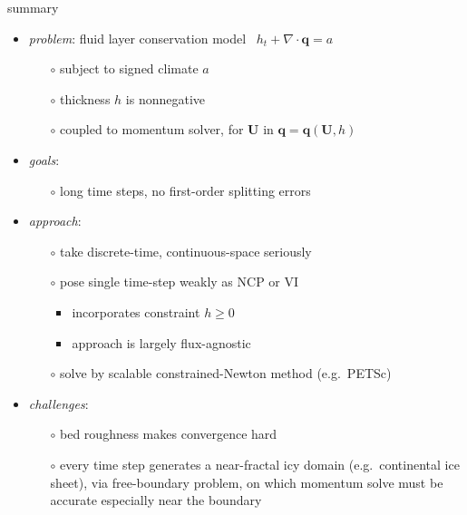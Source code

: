 \documentclass[xcolor={dvipsnames}]{beamer}
\newcommand\bq{\mathbf{q}}
\newcommand\bU{\mathbf{U}}
\newcommand\Div{\nabla\cdot}
\begin{document}
\begin{frame}{summary}

  \begin{itemize}
  \item \emph{problem}: fluid layer conservation model \, $h_t + \Div\bq = a$
    \begin{itemize}
    \item[$\circ$]  subject to signed climate $a$
    \item[$\circ$]  thickness $h$ is nonnegative
    \item[$\circ$]  coupled to momentum solver, for $\bU$ in $\bq=\bq(\bU,h)$
    \end{itemize}
  \item \emph{goals}:
    \begin{itemize}
    \item[$\circ$]  long time steps, no first-order splitting errors
    \end{itemize}
  \item \emph{approach}:
    \begin{itemize}
    \item[$\circ$]  take discrete-time, continuous-space seriously
    \item[$\circ$]  pose single time-step weakly as NCP or VI
      \begin{itemize}
      \item  incorporates constraint $h\ge 0$
      \item  approach is largely flux-agnostic
      \end{itemize}
    \item[$\circ$]  solve by scalable constrained-Newton method (e.g.~PETSc)
    \end{itemize}
  \item \emph{challenges}:
    \begin{itemize}
    \item[$\circ$]  bed roughness makes convergence hard
    \item[$\circ$]  \alert{every time step generates a near-fractal icy domain (e.g.~continental ice sheet), via free-boundary problem, on which momentum solve must be accurate especially near the boundary}
    \end{itemize}
  \end{itemize}

\end{frame}
\end{document}
